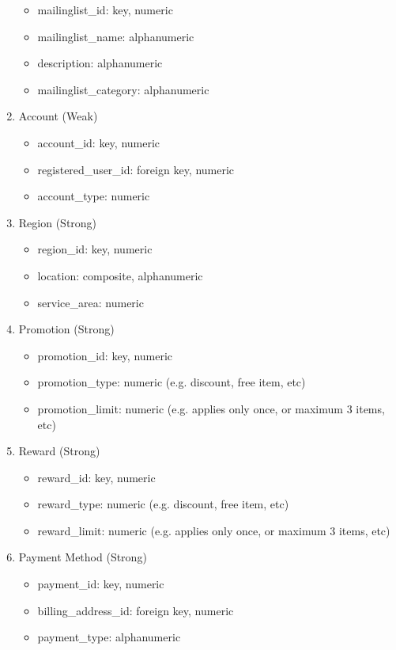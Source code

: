 \begin{enumerate}
\begin{itemize}
        \item mailinglist\_id: key, numeric
        \item mailinglist\_name: alphanumeric
        \item description: alphanumeric
        \item mailinglist\_category: alphanumeric
    \end{itemize}
\item Account (Weak)
    \begin{itemize}
        \item account\_id: key, numeric
        \item registered\_user\_id: foreign key, numeric
        \item account\_type: numeric
    \end{itemize}
\item Region (Strong)
    \begin{itemize}
        \item region\_id: key, numeric
        \item location: composite, alphanumeric
        \item service\_area: numeric
    \end{itemize}
\item Promotion (Strong)
    \begin{itemize}
        \item promotion\_id: key, numeric
        \item promotion\_type: numeric (e.g. discount, free item, etc)
        \item promotion\_limit: numeric (e.g. applies only once, or maximum 3 items, etc)
    \end{itemize}
\item Reward (Strong)
    \begin{itemize}
        \item reward\_id: key, numeric
        \item reward\_type: numeric (e.g. discount, free item, etc)
        \item reward\_limit: numeric (e.g. applies only once, or maximum 3 items, etc)
    \end{itemize}
\item Payment Method (Strong)
    \begin{itemize}
        \item payment\_id: key, numeric
        \item billing\_address\_id: foreign key, numeric
        \item payment\_type: alphanumeric

\end{itemize}
\end{enumerate}
